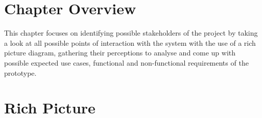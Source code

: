 


\section{Chapter Overview}
This chapter focuses on identifying possible stakeholders of the project by taking a look at all possible points of interaction with the system with the use of a rich picture diagram, gathering their perceptions to analyse and come up with possible expected use cases, functional and non-functional requirements of the prototype. 

\section{Rich Picture}


